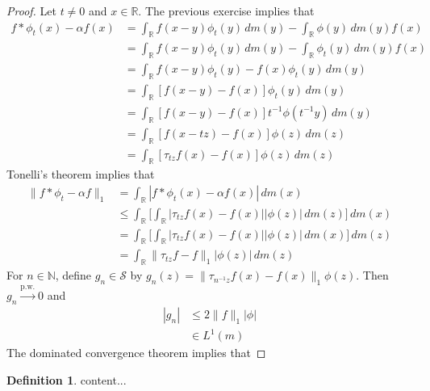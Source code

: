 \documentclass[12pt]{amsart}
\theoremstyle{definition}
\newtheorem{defn}[definition]{Definition}
\newcommand{\al}{\alpha}
\newcommand{\N}{\mathbb{N}}
\newcommand{\R}{\mathbb{R}}
\newcommand{\MS}{\mathcal{S}}
\newcommand{\dm}{\, d m}
\newcommand{\convt}[1]{\xrightarrow{\text{#1}}}
\begin{document}
	\begin{proof}
		Let $t \neq 0$ and $x \in \R$. The previous exercise implies that 
		\begin{align*}
			f * \phi_t(x) - \al f(x) 
			& = \int_{\R} f(x-y) \phi_t(y) \dm(y) - \int_{\R} \phi(y) \dm(y) f(x) \\
			& = \int_{\R} f(x-y) \phi_t(y) \dm(y) - \int_{\R} \phi_t(y) \dm(y) f(x) \\
			& = \int_{\R} f(x-y) \phi_t(y)  -  f(x) \phi_t(y) \dm(y) \\
			& = \int_{\R} [f(x-y)  -  f(x)] \phi_t(y) \dm(y) \\
			& = \int_{\R} [f(x-y)  -  f(x)] t^{-1}\phi(t^{-1}y) \dm(y) \\
			& = \int_{\R} [f(x-tz)  -  f(x)] \phi(z) \dm(z) \\
			& = \int_{\R} [\tau_{tz}f(x) -  f(x)] \phi(z) \dm(z)   
		\end{align*}
		Tonelli's theorem implies that 
		\begin{align*}
			\|f * \phi_t - \al f \|_1
			& = \int_{\R}|f * \phi_t(x) - \al f(x) | \dm(x) \\
			& \leq \int_{\R} \bigg[ \int_{\R} |\tau_{tz}f(x)  -  f(x)| |\phi(z)| \dm(z) \bigg] \dm(x) \\
			& =  \int_{\R} \bigg[ \int_{\R} |\tau_{tz}f(x)  -  f(x)| |\phi(z)| \dm(x) \bigg] \dm(z) \\
			& = \int_{\R} \|\tau_{tz}f - f\|_1|\phi(z)| \dm(z)
		\end{align*}
		For $n \in \N$, define $g_n \in \MS$ by $g_n(z) = \|\tau_{n^{-1}z}f(x)  -  f(x)\|_1 \phi(z)$. Then $g_n \convt{p.w.} 0$ and 
		\begin{align*}
			|g_n| 
			& \leq 2\|f\|_1|\phi| \\
			& \in L^1(m)
		\end{align*} 
		The dominated convergence theorem implies that 
		
	\end{proof}

	
	


	\begin{defn}
		content...
	\end{defn}
	
	
	
	
	
	
	
	
	
	
	
	
	
	
	
\end{document}
